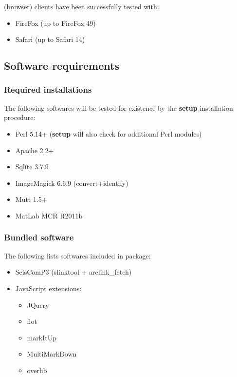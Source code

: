 \webobs (browser) clients have been successfully tested with:
\begin{itemize}
\item   FireFox (up to FireFox 49)
\item   Safari (up to Safari 14)
\end{itemize}


\subsection{Software requirements}

\subsubsection{Required installations}

The following softwares will be tested for existence by the \textbf{setup} installation procedure:

\begin{itemize}
\item   Perl 5.14+ (\textbf{setup} will also check for additional Perl modules)
\item   Apache 2.2+
\item   Sqlite 3.7.9
\item   ImageMagick 6.6.9 (convert+identify)
\item   Mutt 1.5+
\item   MatLab MCR R2011b
\end{itemize}

\subsubsection{Bundled software}

The following lists softwares included in \webobs package:

\begin{itemize}
\item   SeisComP3 (slinktool + arclink\_fetch)
\item   JavaScript extensions:
\begin{itemize}
\item   JQuery
\item   flot
\item   markItUp
\item	MultiMarkDown
\item   overlib
\end{itemize}
\end{itemize}

